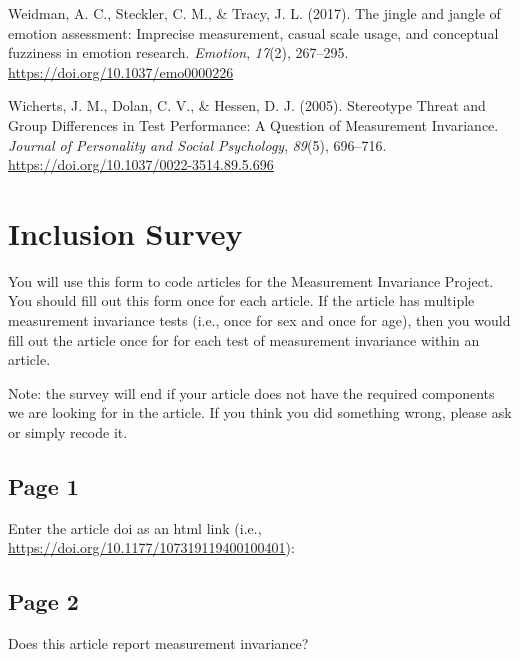 \documentclass[
  man]{apa7}
\newlength{\cslhangindent}
\newlength{\cslentryspacingunit} %
\newenvironment{CSLReferences}[2] %
 {%
  \setlength{\parindent}{0pt}
  \ifodd #1
  \let\oldpar\par
  \def\par{\hangindent=\cslhangindent\oldpar}
  \fi
  \setlength{\parskip}{#2\cslentryspacingunit}
 }%
 {}
\begin{document}
\begin{CSLReferences}{1}{0}
\leavevmode{}%
Weidman, A. C., Steckler, C. M., \& Tracy, J. L. (2017). The jingle and jangle of emotion assessment: Imprecise measurement, casual scale usage, and conceptual fuzziness in emotion research. \emph{Emotion}, \emph{17}(2), 267--295. \url{https://doi.org/10.1037/emo0000226}

\leavevmode{}%
Wicherts, J. M., Dolan, C. V., \& Hessen, D. J. (2005). Stereotype Threat and Group Differences in Test Performance: A Question of Measurement Invariance. \emph{Journal of Personality and Social Psychology}, \emph{89}(5), 696--716. \url{https://doi.org/10.1037/0022-3514.89.5.696}

\end{CSLReferences}

\newpage

\hypertarget{appendix-appendix}{%
\appendix}


\hypertarget{inclusion-survey}{%
\section{Inclusion Survey}\label{inclusion-survey}}

You will use this form to code articles for the Measurement Invariance Project. You should fill out this form once for each article. If the article has multiple measurement invariance tests (i.e., once for sex and once for age), then you would fill out the article once for for each test of measurement invariance within an article.

Note: the survey will end if your article does not have the required components we are looking for in the article. If you think you did something wrong, please ask or simply recode it.

\hypertarget{page-1}{%
\subsection{Page 1}\label{page-1}}

Enter the article doi as an html link (i.e., \url{https://doi.org/10.1177/107319119400100401}):

\hypertarget{page-2}{%
\subsection{Page 2}\label{page-2}}

Does this article report measurement invariance?
\end{document}
